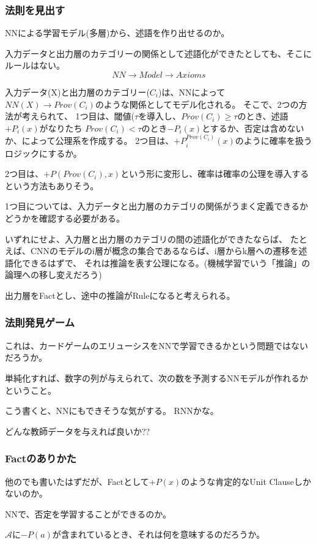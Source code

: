 \documentclass[10pt, oneside]{jarticle}   	%
\begin{document}
\subsubsection{法則を見出す}
NNによる学習モデル(多層)から、述語を作り出せるのか。

入力データと出力層のカテゴリーの関係として述語化ができたとしても、そこにルールはない。
$$ NN \to Model \to Axioms$$

入力データ(X)と出力層のカテゴリー($C_i$)は、NNによって
$NN(X) \to Prov(C_i)$のような関係としてモデル化される。
そこで、2つの方法が考えられて、
1つ目は、閾値($\tau$を導入し、$Prov(C_i) \geq \tau$のとき、述語$+P_i(x)$がなりたち
$Prov(C_i) < \tau$のとき$-P_i(x)$とするか、否定は含めないか、によって公理系を作成する。
2つ目は、$+P_i^{Prov(C_i)}(x)$のように確率を扱うロジックにするか。

2つ目は、$+P(Prov(C_i), x)$という形に変形し、確率は確率の公理を導入するという方法もありそう。

1つ目については、入力データと出力層のカテゴリの関係がうまく定義できるかどうかを確認する必要がある。

いずれにせよ、入力層と出力層のカテゴリの間の述語化ができたならば、
たとえば、CNNのモデルのi層が概念の集合であるならば、i層からk層への遷移を述語化できるはずで、
それは推論を表す公理になる。(機械学習でいう「推論」の論理への移し変えだろう)

出力層をFactとし、途中の推論がRuleになると考えられる。

\subsubsection{法則発見ゲーム}
これは、カードゲームのエリューシスをNNで学習できるかという問題ではないだろうか。

単純化すれば、数字の列が与えられて、次の数を予測するNNモデルが作れるかということ。

こう書くと、NNにもできそうな気がする。
RNNかな。

どんな教師データを与えれば良いか??


\subsubsection{Factのありかた}
他のでも書いたはずだが、Factとして$+P(x)$のような肯定的なUnit Clauseしかないのか。

NNで、否定を学習することができるのか。

$\mathcal{A}$に$-P(a)$が含まれているとき、それは何を意味するのだろうか。
\end{document}
